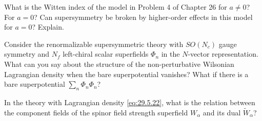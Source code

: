 
\begin{enumerate}
   What is the Witten index of the model in Problem 4 of Chapter 26
  for $a\ne 0$? For $a=0$? Can supersymmetry be broken by higher-order
  effects in this model for $a=0$? Explain.

   Consider the renormalizable supersymmetric theory with
  $SO(N_c)$ gauge symmetry and $N_f$ left-chiral scalar superfields
  $\Phi_n$ in the $N$-vector representation. What can you say about the
  structure of the non-perturbative Wilsonian Lagrangian density when
  the bare superpotential vanishes? What if there is a bare
  superpotential $\sum_n\Phi_n\Phi_n$?

   In the theory with Lagrangian density \eqref{eq:29.5.22}, what
  is the relation between the component fields of the spinor field
  strength superfield $W_\alpha$ and its dual
  $\widetilde W_\alpha$?
\end{enumerate}
